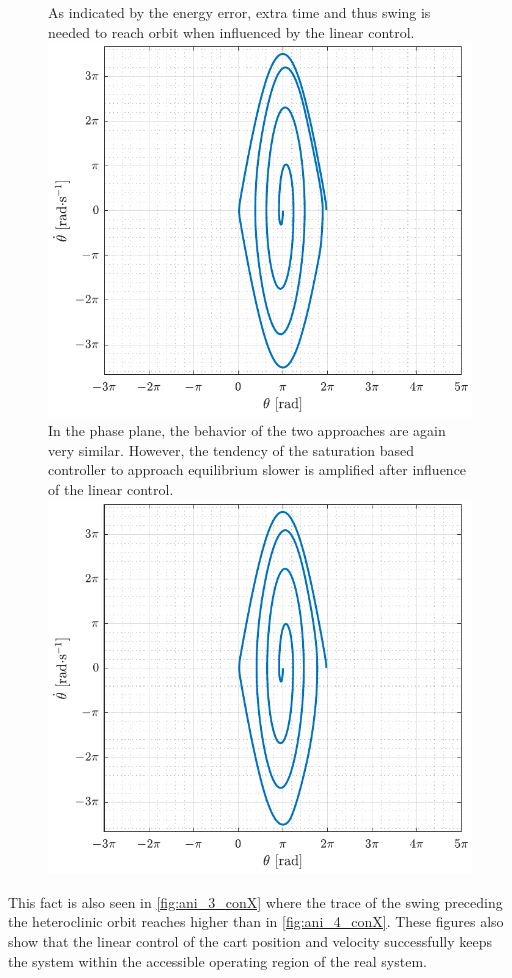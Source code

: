 \begin{figure}[H]
  \hspace{-10pt}
  \captionbox
  {
    As indicated by the energy error, extra time and thus swing is needed to reach orbit when influenced by the linear control.
    \label{fig:phase_3_conX}
  }
  {
    \hspace{-1cm}
    \includegraphics[width=.46\textwidth]{figures/phase_3_conX}
  }
  \hspace{20pt}
  \captionbox 
  {
    In the phase plane, the behavior of the two approaches are again very similar. However, the tendency of the saturation based controller to approach equilibrium slower is amplified after influence of the linear control.
    \label{fig:phase_4_conX}
  }
  {
    \hspace{-1cm}
    \includegraphics[width=.46\textwidth]{figures/phase_4_conX}
  }  
\end{figure}
%
This fact is also seen in \autoref{fig:ani_3_conX} where the trace of the swing preceding the heteroclinic orbit reaches higher than in \autoref{fig:ani_4_conX}. These figures also show that the linear control of the cart position and velocity successfully keeps the system within the accessible operating region of the real system.
%
